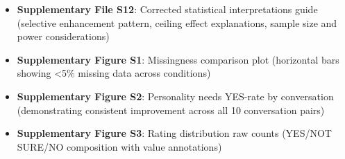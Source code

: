 \documentclass[apajournal,article,submit,moreauthors]{Definitions/mdpi}
\begin{document}
\begin{itemize}
\item
  \textbf{Supplementary File S12}: Corrected statistical interpretations guide (selective enhancement pattern, ceiling effect explanations, sample size and power considerations)
\item
  \textbf{Supplementary Figure S1}: Missingness comparison plot (horizontal bars showing \textless5\% missing data across conditions)
\item
  \textbf{Supplementary Figure S2}: Personality needs YES-rate by conversation (demonstrating consistent improvement across all 10 conversation pairs)
\item
  \textbf{Supplementary Figure S3}: Rating distribution raw counts (YES/NOT SURE/NO composition with value annotations)
\end{itemize}
\end{document}
